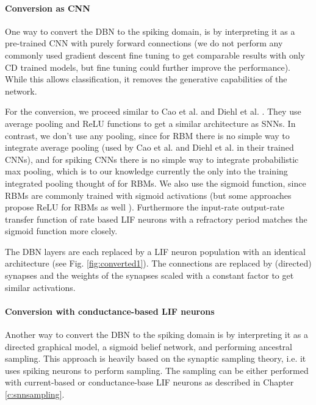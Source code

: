 \paragraph{Conversion as CNN}  \label{c:convascnn}

One way to convert the DBN to the spiking domain, is by interpreting it as a pre-trained CNN with purely forward connections (we do not perform any commonly used gradient descent fine tuning to get comparable results with only CD trained models, but fine tuning could further improve the performance).
While this allows classification, it removes the generative capabilities of the network.

For the conversion, we proceed similar to Cao et al. and Diehl et al. \cite{Cao2014}\cite{Diehl2015} .
They use average pooling and ReLU functions to get a similar architecture as SNNs.
In contrast, we don't use any pooling, since for RBM there is no simple way to integrate average pooling (used by Cao et al. and Diehl et al. in their trained CNNs), and for spiking CNNs there is no simple way to integrate probabilistic max pooling, which is to our knowledge currently the only into the training integrated pooling thought of for RBMs.
We also use the sigmoid function, since RBMs are commonly trained with sigmoid activations (but some approaches propose ReLU for RBMs as well \cite{Nair2010}).
Furthermore the input-rate output-rate transfer function of rate based LIF neurons with a refractory period matches the sigmoid function more closely.

The DBN layers are each replaced by a LIF neuron population with an identical architecture (see Fig. \ref{fig:converted1}). 
The connections are replaced by (directed) synapses and the weights of the synapses scaled with a constant factor to get similar activations.
 

\paragraph{Conversion with conductance-based LIF neurons} \label{c:convascoba}

Another way to convert the DBN to the spiking domain is by interpreting it as a directed graphical model, a sigmoid belief network, and performing ancestral sampling.
This approach is heavily based on the synaptic sampling theory, i.e. it uses spiking neurons to perform sampling.
The sampling can be either performed with current-based or conductance-base LIF neurons as described in Chapter \ref{c:snnsampling}.

